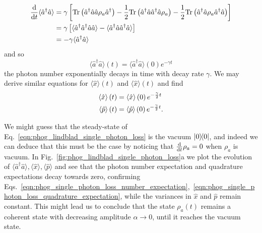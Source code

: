 \begin{align}
\ddt \langle \hat{a}^\dagger \hat{a}\rangle &= \gamma \left[ \text{Tr}\left(\hat{a}^\dagger \hat{a} \hat{a} \rho_a \hat{a}^\dagger \right) - \frac{1}{2} \text{Tr}\left(\hat{a}^\dagger \hat{a} \hat{a}^\dagger \hat{a} \rho_a\right) - \frac{1}{2} \text{Tr}\left(\hat{a}^\dagger \hat{a} \rho_a \hat{a}^\dagger \hat{a}\right)\right] \notag \\
%
&= \gamma \left[ \langle \hat{a}^\dagger \hat{a}^\dagger \hat{a}\hat{a}\rangle - \langle \hat{a}^\dagger \hat{a} \hat{a}^\dagger \hat{a}\rangle \right] \notag \\
%
&= - \gamma \langle \hat{a}^\dagger \hat{a}\rangle
\end{align}
\noindent and so
\begin{equation}\label{eqn:phog_single_photon_loss_number_expectation}
\langle\hat{a}^\dagger \hat{a} \rangle \left(t\right) = \langle \hat{a}^\dagger \hat{a}\rangle \left(0\right) e^{- \gamma t}
\end{equation}
the photon number exponentially decays in time with decay rate $\gamma$. We may derive similar equations for $\langle\hat{x}\rangle\left(t\right)$ and $\langle\hat{x}\rangle\left(t\right)$ and find 
\begin{align}\label{eqn:phog_single_photon_loss_quadrature_expectation}
 \langle \hat{x}\rangle\left(t\right) &= \langle \hat{x}\rangle\left(0\right) e^{- \frac{\gamma}{2} t} \notag \\
%
 \langle \hat{p}\rangle\left(t\right) &= \langle \hat{p}\rangle \left(0\right) e^{- \frac{\gamma}{2} t}.
\end{align}

\noindent We might guess that the steady-state of Eq.~\ref{eqn:phog_lindblad_single_photon_loss} is the vacuum $\dyad{0}$, and indeed we can deduce that this must be the case by noticing that $\frac{\mathrm{d}}{\mathrm{d}t} \rho_a = 0$ when $\rho_a$ is vacuum. In Fig.~\ref{fig:phog_lindblad_single_photon_loss}a we plot the evolution of $\langle\hat{a}^\dagger \hat{a}\rangle, \langle \hat{x}\rangle, \langle \hat{p}\rangle$ and see that the photon number expectation and quadrature expectations decay towards zero, confirming Eqs.~\ref{eqn:phog_single_photon_loss_number_expectation},~\ref{eqn:phog_single_photon_loss_quadrature_expectation}, while the variances in $\hat{x}$ and $\hat{p}$ remain constant. This might lead us to conclude that the state $\rho_a\left(t\right)$ remains a coherent state with decreasing amplitude $\alpha\rightarrow0$, until it reaches the vacuum state.

